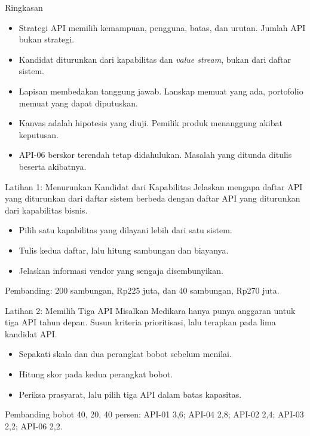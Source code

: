 \documentclass[aspectratio=169, table, 12pt]{beamer}
\begin{document}
\begin{frame}{{\Large Ringkasan}}
  \vspace{6pt}
  \begin{itemize}
    \item Strategi API memilih kemampuan, pengguna, batas, dan urutan. Jumlah API bukan strategi.
    \item Kandidat diturunkan dari kapabilitas dan \textit{value stream}, bukan dari daftar sistem.
    \item Lapisan membedakan tanggung jawab. Lanskap memuat yang ada, portofolio memuat yang dapat diputuskan.
    \item Kanvas adalah hipotesis yang diuji. Pemilik produk menanggung akibat keputusan.
    \item API-06 berskor terendah tetap didahulukan. Masalah yang ditunda ditulis beserta akibatnya.
  \end{itemize}
\end{frame}

\begin{frame}{{\Large Latihan 1: Menurunkan Kandidat dari Kapabilitas}}
  \vspace{8pt}
  Jelaskan mengapa daftar API yang diturunkan dari daftar sistem berbeda dengan daftar API yang diturunkan dari kapabilitas bisnis.
  \vspace{6pt}
  \begin{itemize}
    \item Pilih satu kapabilitas yang dilayani lebih dari satu sistem.
    \item Tulis kedua daftar, lalu hitung sambungan dan biayanya.
    \item Jelaskan informasi vendor yang sengaja disembunyikan.
  \end{itemize}
  \vspace{4pt}
  {\small Pembanding: 200 sambungan, Rp225 juta, dan 40 sambungan, Rp270 juta.}
\end{frame}

\begin{frame}{{\Large Latihan 2: Memilih Tiga API}}
  \vspace{8pt}
  Misalkan Medikara hanya punya anggaran untuk tiga API tahun depan. Susun kriteria prioritisasi, lalu terapkan pada lima kandidat API.
  \vspace{6pt}
  \begin{itemize}
    \item Sepakati skala dan dua perangkat bobot sebelum menilai.
    \item Hitung skor pada kedua perangkat bobot.
    \item Periksa prasyarat, lalu pilih tiga API dalam batas kapasitas.
  \end{itemize}
  \vspace{4pt}
  {\small Pembanding bobot 40, 20, 40 persen: API-01 3,6; API-04 2,8; API-02 2,4; API-03 2,2; API-06 2,2.}
\end{frame}
\end{document}
